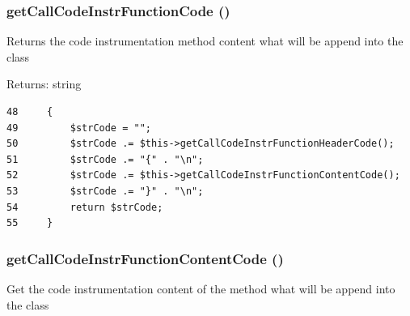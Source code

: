 \hypertarget{class_code_instrumentation_method_5df850508e727984f62860b6987991c0}{
\subsubsection[{getCallCodeInstrFunctionCode}]{\setlength{\rightskip}{0pt plus 5cm}getCallCodeInstrFunctionCode ()}}
\label{class_code_instrumentation_method_5df850508e727984f62860b6987991c0}


Returns the code instrumentation method content what will be append into the class

\begin{Desc}
\item[Returns:]string \end{Desc}


\begin{Code}\begin{verbatim}48     {
49         $strCode = "";
50         $strCode .= $this->getCallCodeInstrFunctionHeaderCode();
51         $strCode .= "{" . "\n";
52         $strCode .= $this->getCallCodeInstrFunctionContentCode();
53         $strCode .= "}" . "\n";
54         return $strCode;
55     }
\end{verbatim}
\end{Code}


\hypertarget{class_code_instrumentation_method_ed55cb9e7235755c7fdab2dc01eb4f47}{
\subsubsection[{getCallCodeInstrFunctionContentCode}]{\setlength{\rightskip}{0pt plus 5cm}getCallCodeInstrFunctionContentCode ()}}
\label{class_code_instrumentation_method_ed55cb9e7235755c7fdab2dc01eb4f47}


Get the code instrumentation content of the method what will be append into the class

